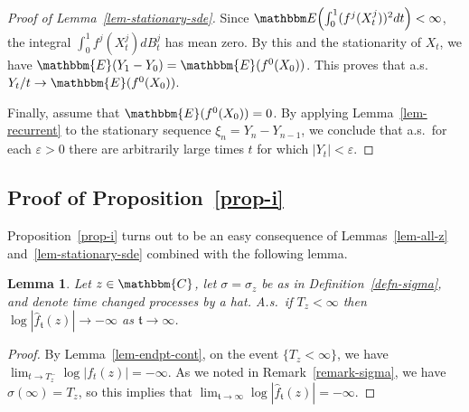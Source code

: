 \documentclass[11pt]{article}
\theoremstyle{plain}
\newtheorem{lem}[thm]{Lemma}
\theoremstyle{definition}
\numberwithin{equation}{section}
\newcommand{\BB}{\mathbbm}
\newcommand{\ep}{\varepsilon}
\newcommand{\rta}{\rightarrow}
\newcommand{\wh}{\widehat}
\newcommand{\tz}{{\mathfrak t}}
\let\originalleft\left
\let\originalright\right
\renewcommand{\left}{\mathopen{}\mathclose\bgroup\originalleft}
\renewcommand{\right}{\aftergroup\egroup\originalright}
\begin{document}
\begin{proof}[Proof of Lemma~\ref{lem-stationary-sde}]
Since $\BB E\left( \int_0^1 (f^j(X_t^j))^2 dt \right) < \infty$, the integral $\int_0^1 f^j(X_t^j) dB_t^j$ has mean zero. %
By this and the stationarity of  $X_t$, we have $\BB{E}(Y_1-Y_0) = \BB{E}(f^0(X_0 ))$.  This proves that a.s.\ $Y_t/t \rta \BB{E}(f^0(X_0 ))$. 

Finally, assume that $\BB{E}(f^0(X_0 )) = 0$.  
By applying Lemma~\ref{lem-recurrent} to the stationary sequence $\xi_n = Y_n - Y_{n-1}$, we conclude that a.s.\ for each $\ep> 0$ there are arbitrarily large times $t$ for which $|Y_t|  < \ep$. 
\end{proof}



\subsection{Proof of Proposition~\ref{prop-i} }


Proposition~\ref{prop-i} turns out to be an easy consequence of Lemmas~\ref{lem-all-z} and~\ref{lem-stationary-sde} combined with the following lemma. 


\begin{lem}
\label{lem-swallow-distance}
Let $z \in \BB{C} $, let $\sigma=\sigma_z$ be as in Definition~\ref{defn-sigma}, and denote time changed processes by a hat. A.s.\ if $T_z < \infty$ then $\log |\wh f_\tz(z)| \rta -\infty$ as $\tz \rta \infty$.
\end{lem}

\begin{proof}
By Lemma~\ref{lem-endpt-cont}, on the event $\{T_z < \infty\}$, we have $\lim_{t \rta T_z^-} \log |f_t(z)| = -\infty$.
As we noted in Remark~\ref{remark-sigma}, we have $\sigma(\infty) = T_z$, so this implies that $\lim_{\tz \rta \infty} \log |\wh f_\tz(z)| = -\infty$. 
\end{proof}
\end{document}
